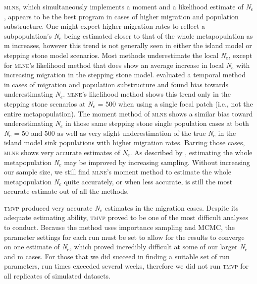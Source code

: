 \textsc{mlne}, which simultaneously implements a moment and a likelihood estimate of \emph{N}$_e$, 
appears to be the best program in cases of higher migration and population substructure. One might 
expect higher migration rates to reflect a subpopulation's \emph{N}$_e$ being estimated closer to 
that of the whole metapopulation as m increases, however this trend is not generally seen in either 
the island model or stepping stone model scenarios. Most methods underestimate the local \emph{N}$_e$, 
except for \textsc{mlne}'s likelihood method that does show an average increase in local \emph{N}$_e$ 
with increasing migration in the stepping stone model. \citet{Ryman:2013} evaluated a temporal method 
in cases of migration and population substructure and found bias towards underestimating \emph{N}$_e$. 
\textsc{mlne}'s likelihood method shows this trend only in the stepping stone scenarios at \emph{N}$_e$ = 500 
when using a single focal patch (i.e., not the entire metapopulation). The moment method of \textsc{mlne} shows 
a similar bias toward underestimating \emph{N}$_e$ in those same stepping stone single population 
cases at both \emph{N}$_e$ = 50 and 500 as well as very slight underestimation of the true \emph{N}$_e$ 
in the island model sink populations with higher migration rates. Barring those cases, \textsc{mlne} shows 
very accurate estimates of \emph{N}$_e$. As described by \citet{Ryman:2013}, estimating the whole 
metapopulation \emph{N}$_e$ may be improved by increasing sampling. Without increasing our sample size, 
we still find \textsc{mlne}'s moment method to estimate the whole metapopulation \emph{N}$_e$ quite 
accurately, or when less accurate, is still the most accurate estimate out of all the methods.

\textsc{tmvp} produced very accurate \emph{N}$_e$ estimates in the migration cases. Despite 
its adequate estimating ability, \textsc{tmvp} proved to be one of the most difficult analyses to conduct. 
Because the method uses importance sampling and MCMC, the parameter settings for each run must be set to 
allow for the results to converge on one estimate of \emph{N}$_e$, which proved incredibly difficult at 
some of our larger \emph{N}$_e$ and m cases. For those that we did succeed in finding a suitable set of 
run parameters, run times exceeded several weeks, therefore we did not run \textsc{tmvp} for all 
replicates of simulated datasets.

